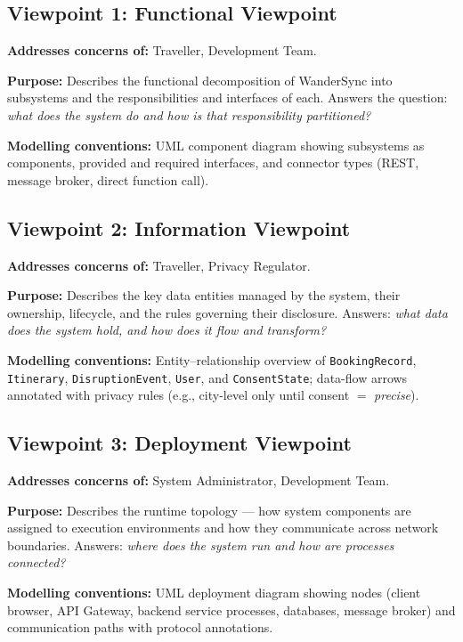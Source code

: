 \documentclass[12pt,a4paper]{article}
\begin{document}
\subsection{Viewpoint 1: Functional Viewpoint}

\textbf{Addresses concerns of:} Traveller, Development Team.

\textbf{Purpose:} Describes the functional decomposition of WanderSync into subsystems and the
responsibilities and interfaces of each. Answers the question: \textit{what does the system do and
how is that responsibility partitioned?}

\textbf{Modelling conventions:} UML component diagram showing subsystems as components, provided
and required interfaces, and connector types (REST, message broker, direct function call).

\subsection{Viewpoint 2: Information Viewpoint}

\textbf{Addresses concerns of:} Traveller, Privacy Regulator.

\textbf{Purpose:} Describes the key data entities managed by the system, their ownership, lifecycle,
and the rules governing their disclosure. Answers: \textit{what data does the system hold, and how
does it flow and transform?}

\textbf{Modelling conventions:} Entity–relationship overview of \texttt{BookingRecord},
\texttt{Itinerary}, \texttt{DisruptionEvent}, \texttt{User}, and \texttt{ConsentState}; data-flow
arrows annotated with privacy rules (e.g., city-level only until consent $=$ \textit{precise}).

\subsection{Viewpoint 3: Deployment Viewpoint}

\textbf{Addresses concerns of:} System Administrator, Development Team.

\textbf{Purpose:} Describes the runtime topology — how system components are assigned to execution
environments and how they communicate across network boundaries. Answers: \textit{where does the
system run and how are processes connected?}

\textbf{Modelling conventions:} UML deployment diagram showing nodes (client browser, API Gateway,
backend service processes, databases, message broker) and communication paths with protocol
annotations.
\end{document}
